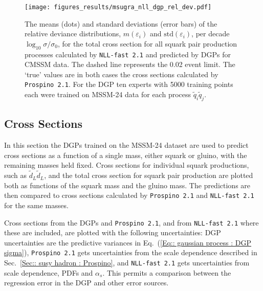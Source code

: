 \documentclass[twoside,english]{uiofysmaster}
\begin{document}
{{\begin{figure}
\centering
\texttt{[image: figures\_results/msugra\_nll\_dgp\_rel\_dev.pdf]}
\caption[Relative deviance distributions for the optimal DGP, CMSSM]{The means (dots) and standard deviations (error bars) of the relative deviance distributions, $m(\varepsilon_i)$ and $\mathrm{std}(\varepsilon_i)$, per decade $\log_{10} \sigma / \sigma_0$, for the total cross section for all squark pair production processes calculated by {\tt NLL-fast 2.1} and predicted by DGPs for CMSSM data. The dashed line represents the 0.02 event limit. The `true' values are in both cases the cross sections calculated by {\tt Prospino 2.1}. For the DGP ten experts with 5000 training points each were trained on MSSM-24 data for each process $\widetilde{q}_i \widetilde{q}_j$.}
\label{Fig:: results : RD CMSSM}
\end{figure}

\subsection{Cross Sections}\label{Sec:: results : Cross Sections}

In this section the DGPs trained on the MSSM-24 dataset are used to predict cross sections as a function of a single mass, either squark or gluino, with the remaining masses held fixed. Cross sections for individual squark productions, such as $\widetilde{d}_L \widetilde{d}_L$, and the total cross section for squark pair production are plotted both as functions of the squark mass and the gluino mass. The predictions are then compared to cross sections calculated by \verb|Prospino 2.1| and \verb|NLL-fast 2.1| for the same masses.

Cross sections from the DGPs and \verb|Prospino 2.1|, and from \verb|NLL-fast 2.1| where these are included, are plotted with the following uncertainties: DGP uncertainties are the predictive variances in Eq.~(\ref{Eq:: gaussian process : DGP sigma}), \verb|Prospino 2.1| gets uncertainties from the scale dependence described in Sec.~\ref{Sec:: susy hadron : Prospino}, and \verb|NLL-fast 2.1| gets uncertainties from scale dependence, PDFs and $\alpha_s$. This permits a comparison between the regression error in the DGP and other error sources.

}}
\end{document}
